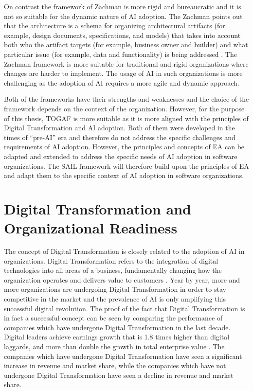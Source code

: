 \documentclass[]{imc-inf}
\begin{document}
On contrast the framework of Zachman is more rigid and bureaucratic and
it is not so suitable for the dynamic nature of AI adoption. The Zachman
points out that the architecture is a schema for organizing
architectural artifacts (for example, design documents, specifications,
and models) that takes into account both who the artifact targets (for
example, business owner and builder) and what particular issue (for
example, data and functionality) is being addressed \citep{RobertsonDunn2012}. The Zachman
framework is more suitable for traditional and rigid organizations where
changes are harder to implement. The usage of AI in such organizations
is more challenging as the adoption of AI requires a more agile and
dynamic approach.

Both of the frameworks have their strengths and weaknesses and the
choice of the framework depends on the context of the organization.
However, for the purpose of this thesis, TOGAF is more suitable as it is
more aligned with the principles of Digital Transformation and AI
adoption. Both of them were developed in the times of ``pre-AI'' era and
therefore do not address the specific challenges and requirements of AI
adoption. However, the principles and concepts of EA can be adapted and
extended to address the specific needs of AI adoption in software
organizations. The SAIL framework will therefore build upon the
principles of EA and adapt them to the specific context of AI adoption
in software organizations.

\section{Digital Transformation and Organizational Readiness}

The concept of Digital Transformation is closely related to the adoption
of AI in organizations. Digital Transformation refers to the integration
of digital technologies into all areas of a business, fundamentally
changing how the organization operates and delivers value to customers \citep{Westerman2019}.
Year by year, more and more organizations are undergoing Digital
Transformation in order to stay competitive in the market and the
prevalence of AI is only amplifying this successful digital revolution.
The proof of the fact that Digital Transformation is in fact a
successful concept can be seen by comparing the performance of companies
which have undergone Digital Transformation in the last decade. Digital leaders
achieve earnings growth that is 1.8 times higher than digital laggards, and more than
double the growth in total enterprise value \citep{BCG2020}. The companies which have undergone
Digital Transformation have seen a significant increase in revenue and
market share, while the companies which have not undergone Digital
Transformation have seen a decline in revenue and market share.
\end{document}
